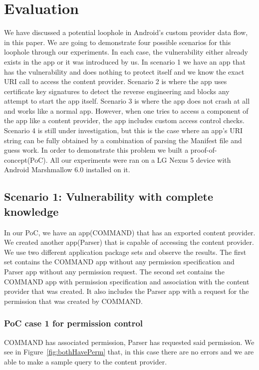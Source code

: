 \section{Evaluation}
\label{eval}
\noindent
We have discussed a potential loophole in Android's custom provider data flow, in this paper. We are going to demonstrate four possible scenarios for this loophole through our experiments. In each case, the vulnerability either already exists in the app or it was introduced by us. In scenario 1 we have an app that has the vulnerability and does nothing to protect itself and we know the exact URI call to access the content provider. Scenario 2 is where the app uses certificate key signatures to detect the reverse engineering and blocks any attempt to start the app itself. Scenario 3 is where the app does not crash at all and works like a normal app. However, when one tries to access a component of the app like a content provider, the app includes custom access control checks. Scenario 4 is still under investigation, but this is the case  where an app's URI string can be fully obtained by a combination of parsing the Manifest file and guess work. In order to demonstrate this problem we built a proof-of-concept(PoC). All our experiments were ran on a LG Nexus 5 device with Android Marshmallow 6.0 installed on it.

\subsection{Scenario 1: Vulnerability with complete knowledge}
In our PoC, we have an app(COMMAND) that has an exported content provider. We created another app(Parser) that is capable of accessing the content provider. We use two different application package sets and observe the results. The first set contains the COMMAND app without any permission specification and Parser app without any permission request. The second set contains the COMMAND app with permission specification and association with the content provider that was created. It also includes the Parser app with a request for the permission that was created by COMMAND.

\subsubsection{PoC case 1 for permission control} COMMAND has associated permission, Parser has requested said permission. We see in Figure~\ref{fig:bothHavePerm} that, in this case there are no errors and we are able to make a sample query to the content provider.
